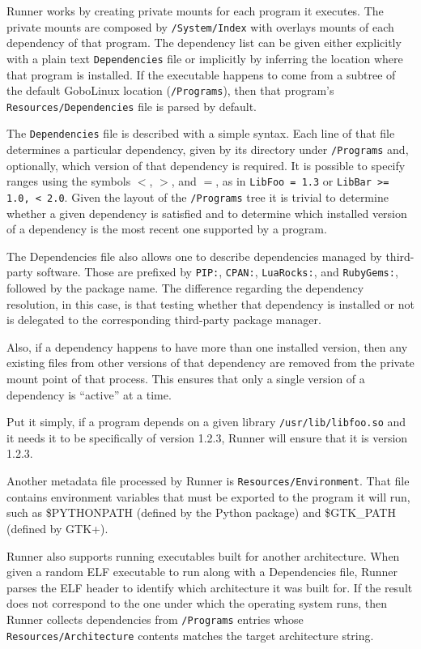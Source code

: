 \documentclass[sigplan, anonymous, 10pt]{acmart}
\begin{document}
Runner works by creating private mounts for each program it executes. The
private mounts are composed by \texttt{/Sys\-tem/Index} with overlays mounts
of each dependency of that program. The dependency list can be given either
explicitly with a plain text \texttt{Dependencies} file or implicitly by
inferring the location where that program is installed. If the executable
happens to come from a subtree of  the default GoboLinux location
(\texttt{/Programs}), then that program's \texttt{Resources/Dependencies}
file is parsed by default.

The \texttt{Dependencies} file is described with a simple syntax. Each line of that file determines
a particular dependency, given by its directory under \texttt{/Programs} and, optionally,
which version of that dependency is required. It is possible to specify ranges using the
symbols $<$, $>$, and $=$, as in \texttt{LibFoo = 1.3} or \texttt{LibBar >= 1.0, < 2.0}.
Given the layout of the \texttt{/Programs} tree it is trivial to determine whether a given
dependency is satisfied and to determine which installed version of a dependency is the most
recent one supported by a program.

The Dependencies file also allows one to describe dependencies managed by third-party
software. Those are prefixed by \texttt{PIP:}, \texttt{CPAN:}, \texttt{LuaRocks:}, and
\texttt{RubyGems:}, followed by the package name. The difference regarding the dependency
resolution, in this case, is that testing whether that dependency is installed or not is
delegated to the corresponding third-party package manager.

Also, if a dependency happens to have more than
one installed version, then any existing files from other versions of that
dependency are removed from the private mount point of that process. This
ensures that only a single version of a dependency is ``active'' at a time.

Put it simply, if a program depends on a given library \texttt{/usr/lib/lib\-foo.so} and it
needs it to be specifically of version 1.2.3, Runner will ensure that it is
version 1.2.3.

Another metadata file processed by Runner is \texttt{Resources/Environment}.
That file contains environment variables that must be exported to the
program it will run, such as \$PYTHONPATH (defined by the Python package)
and \$GTK\_PATH (defined by GTK+).

Runner also supports running executables built for another architecture.
When given a random ELF executable to run along with a Dependencies file,
Runner parses the ELF header to identify which architecture it was built
for. If the result does not correspond to the one under which the operating
system runs, then Runner collects dependencies from \texttt{/Programs}
entries whose \texttt{Resources/Architecture} contents matches the target
architecture string.
\end{document}
